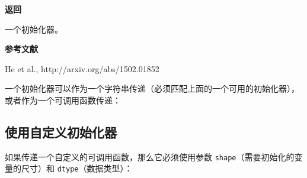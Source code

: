 \textbf{返回}

一个初始化器。

\textbf{参考文献}

He et al., http://arxiv.org/abs/1502.01852

一个初始化器可以作为一个字符串传递（必须匹配上面的一个可用的初始化器），或者作为一个可调用函数传递：

\begin{Shaded}
\begin{Highlighting}[]
  

\OperatorTok{=}\OperatorTok{=}\NormalTok{)))}

\OperatorTok{=}\NormalTok{))}
\end{Highlighting}
\end{Shaded}

\subsection{使用自定义初始化器}\label{ux4f7fux7528ux81eaux5b9aux4e49ux521dux59cbux5316ux5668}

如果传递一个自定义的可调用函数，那么它必须使用参数
\texttt{shape}（需要初始化的变量的尺寸）和 \texttt{dtype}（数据类型）：

\begin{Shaded}
\begin{Highlighting}[]
   

 \OperatorTok{=}\NormalTok{):}
     \OperatorTok{=}

\OperatorTok{=}
\end{Highlighting}
\end{Shaded}

\newpage